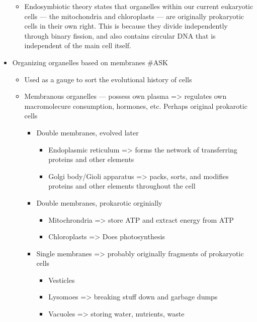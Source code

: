 \documentclass[letterpaper]{article}
\begin{document}
\begin{itemize}
\begin{itemize}
\item Endosymbiotic theory states that organelles within our current
eukaryotic cells --- the mitochondria and chloroplasts --- are
originally prokaryotic cells in their own right. This is because
they divide independently through binary fission, and also contains
circular DNA that is independent of the main cell itself.
\end{itemize}

\item Organizing organelles based on membranes \#ASK

\begin{itemize}
\item Used as a gauge to sort the evolutional history of cells
\item Membranous organelles --- possess own plasma => regulates own
macromolecure consumption, hormones, etc. Perhaps original
prokarotic cells

\begin{itemize}
\item Double membranes, evolved later

\begin{itemize}
\item Endoplasmic reticulum => forms the network of transferring
proteins and other elements
\item Golgi body/Gioli apparatus => packs, sorts, and modifies
proteins and other elements throughout the cell
\end{itemize}

\item Double membranes, prokarotic orginially

\begin{itemize}
\item Mitochrondria => store ATP and extract energy from ATP
\item Chloroplasts => Does photosynthesis
\end{itemize}

\item Single membranes => probably originally fragments of prokaryotic
cells

\begin{itemize}
\item Vesticles
\item Lysomoes => breaking stuff down and garbage dumps
\item Vacuoles => storing water, nutrients, waste
\end{itemize}
\end{itemize}


\end{itemize}
\end{itemize}
\end{document}
